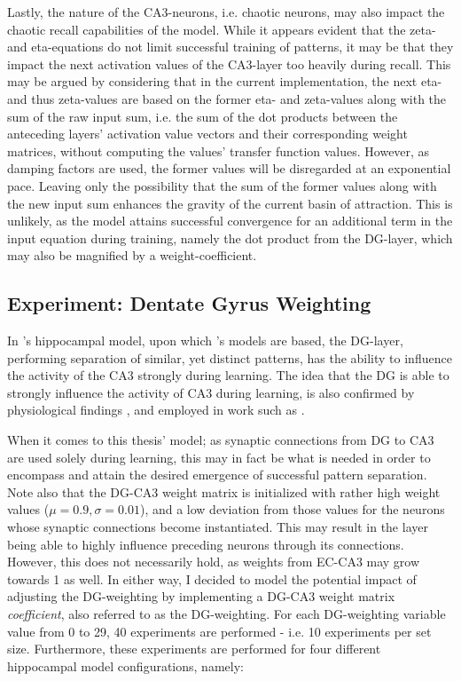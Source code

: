 Lastly, the nature of the CA3-neurons, i.e. chaotic neurons, may also impact the chaotic recall capabilities of the model. While it appears evident that the zeta- and eta-equations do not limit successful training of patterns, it may be that they impact the next activation values of the CA3-layer too heavily during recall. This may be argued by considering that in the current implementation, the next eta- and thus zeta-values are based on the former eta- and zeta-values along with the sum of the raw input sum, i.e. the sum of the dot products between the anteceding layers' activation value vectors and their corresponding weight matrices, without computing the values' transfer function values. 
However, as damping factors are used, the former values will be disregarded at an exponential pace. Leaving only the possibility that the sum of the former values along with the new input sum enhances the gravity of the current basin of attraction. This is unlikely, as the model attains successful convergence for an additional term in the input equation during training, namely the dot product from the DG-layer, which may also be magnified by a weight-coefficient.


\subsection{Experiment: Dentate Gyrus Weighting}

In \citeauthor{Wakagi2008}'s \citeyear{Wakagi2008} hippocampal model, upon which \citeauthor{Hattori2010}'s \citeyear{Hattori2010, Hattori2014} models are based, the DG-layer, performing separation of similar, yet distinct patterns, has the ability to influence the activity of the CA3 strongly during learning. The idea that the DG is able to strongly influence the activity of CA3 during learning, is also confirmed by physiological findings \citep{Rolls1998chpt6}, and employed in work such as \citep{Norman2003}.

When it comes to this thesis' model; as synaptic connections from DG to CA3 are used solely during learning, this may in fact be what is needed in order to encompass and attain the desired emergence of successful pattern separation. Note also that the DG-CA3 weight matrix is initialized with rather high weight values ($\mu=0.9, \sigma=0.01$), and a low deviation from those values for the neurons whose synaptic connections become instantiated. This may result in the layer being able to highly influence preceding neurons through its connections. However, this does not necessarily hold, as weights from EC-CA3 may grow towards 1 as well. In either way, I decided to model the potential impact of adjusting the DG-weighting by implementing a DG-CA3 weight matrix \textit{coefficient}, also referred to as the DG-weighting. For each DG-weighting variable value from 0 to 29, 40 experiments are performed - i.e. 10 experiments per set size. Furthermore, these experiments are performed for four different hippocampal model configurations, namely:

